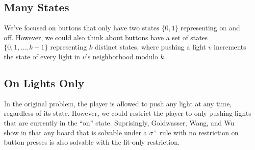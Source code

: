 \documentclass[a4paper]{article}
\begin{document}
	\subsection{Many States}
	We've focused on buttons that only have two states $\{0,1\}$ representing on and off.
	However, we could also think about buttons have a set of states $\{0,1,\dots,k-1\}$ representing $k$ distinct states, where pushing a light $v$ increments the state of every light in $v$'s neighborhood modulo $k$.
	
	\subsection{On Lights Only}
	In the original problem, the player is allowed to push any light at any time, regardless of its state.
	However, we could restrict the player to only pushing lights that are currently in the ``on'' state.
	Suprisingly, Goldwasser, Wang, and Wu show in \cite{GOLDWASSER2009774} that any board that is solvable under a $\sigma^+$ rule with no restriction on button presses is also solvable with the lit-only restriction.

	\newpage
	
	
\end{document}
